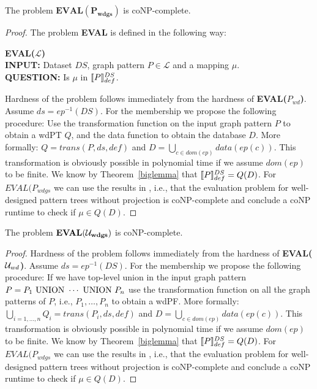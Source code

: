 \begin{corollary}
	The problem $\mathit{\mathbf{EVAL(P_{wdgs})}}$ is coNP-complete.
\end{corollary}
\begin{proof}\label{proof:p_wdgs}
	The problem \textbf{EVAL} is defined in the following way:
\begin{framed}\noindent \textbf{EVAL($\mathcal{L}$)}\\
	\textbf{INPUT:} Dataset $DS$, graph pattern $P \in  \mathcal{L}$ and a mapping $\mu$.\\
	\textbf{QUESTION:} Is $\mu$ in $\llbracket P \rrbracket^{DS}_{def}$.
\end{framed}
Hardness of the problem follows immediately from the hardness of 
\textbf{EVAL($P_{wd}$)}.
Assume $ds = ep^{-1}(DS)$. %
For the membership we propose the following procedure:
Use the transformation function on the input graph pattern $P$ to obtain a wdPT
$Q$, and the data function to obtain the database $D$. More formally:
$Q = trans(P,ds,def)$ and $D = \bigcup\limits_{c\in dom(ep)} data(ep(c))$. This transformation is obviously
possible in polynomial time if we assume $dom(ep)$ to be finite. We know by Theorem~\ref{biglemma} that 
$\llbracket P \rrbracket^{DS}_{def} = Q(D)$.
For $\mathbf{\mathit{EVAL(P_{wdgs}}}$ we can use the results in 
\cite{perez2009semantics}, i.e., that the evaluation problem for well-designed
pattern trees without projection is coNP-complete and conclude a coNP runtime to
check if $\mu \in Q(D)$.  \end{proof}

\begin{corollary}
The problem $\mathit{\mathbf{EVAL(\mathcal{U}_{wdgs})}}$ is coNP-complete. 
\end{corollary}
\begin{proof}
Hardness of the problem follows immediately from the hardness of 
\textbf{EVAL($\mathcal{U}_{wd}$)}.
Assume $ds = ep^{-1}(DS)$. %
For the membership we propose the following procedure:
If we have top-level union in the input graph pattern $P = P_{1} \mbox{ UNION } \cdots
\mbox{ UNION } P_{n}$ use the transformation function on all the graph patterns of $P$, i.e., $P_1,\dots,P_n$
to obtain a wdPF. More formally:
$\bigcup\limits_{i=1,\dots,n}Q_i = trans(P_i,ds,def)$ and $D = \bigcup\limits_{c\in dom(ep)} data(ep(c))$. This transformation is obviously
possible in polynomial time if we assume $dom(ep)$ to be finite. We know by Theorem~\ref{biglemma} that 
$\llbracket P \rrbracket^{DS}_{def} = Q(D)$.
For $\mathbf{\mathit{EVAL(P_{wdgs}}}$ we can use the results in 
\cite{perez2009semantics}, i.e., that the evaluation problem for well-designed
pattern trees without projection is coNP-complete and conclude a coNP runtime to
check if $\mu \in Q(D)$. 
\end{proof}


